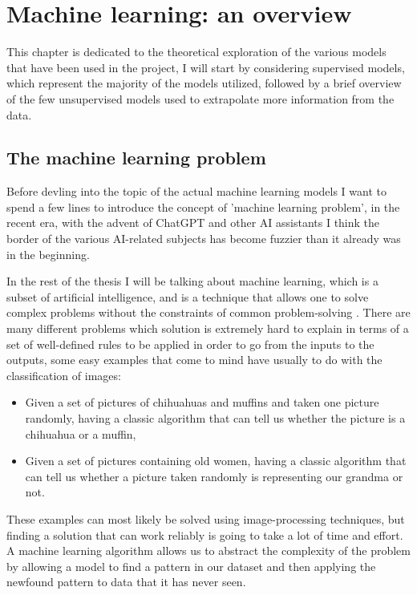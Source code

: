 \chapter{Machine learning: an overview}
\label{chp:ml}
This chapter is dedicated to the theoretical exploration of the various models that have been used
in the project, I will start by considering supervised models, which represent the majority of the
models utilized, followed by a brief overview of the few unsupervised models used to extrapolate
more information from the data.
\section{The machine learning problem}
Before devling into the topic of the actual machine learning models I want to spend a few lines to
introduce the concept of 'machine learning problem', in the recent era, with the advent of ChatGPT
and other AI assistants I think the border of the various AI-related subjects has become fuzzier
than it already was in the beginning.

In the rest of the thesis I will be talking about machine learning, which is a subset of artificial
intelligence, and is a technique that allows one to solve complex problems without the constraints
of common problem-solving \cite{Rebala2019}. There are many different problems which solution is extremely hard to
explain in terms of a set of well-defined rules to be applied in order to go from the inputs to the
outputs, some easy examples that come to mind have usually to do with the classification of images:
\begin{itemize}
	\item Given a set of pictures of chihuahuas and muffins and taken one picture randomly,
	      having a classic algorithm that can tell us whether the picture is a chihuahua or a muffin,
	\item Given a set of pictures containing old women, having a classic algorithm that can tell
	      us whether a picture taken randomly is representing our grandma or not.
\end{itemize}
These examples can most likely be solved using image-processing techniques, but finding a solution
that can work reliably is going to take a lot of time and effort. A machine learning algorithm
allows us to abstract the complexity of the problem by allowing a model to find a pattern in our
dataset and then applying the newfound pattern to data that it has never seen.

\medskip

